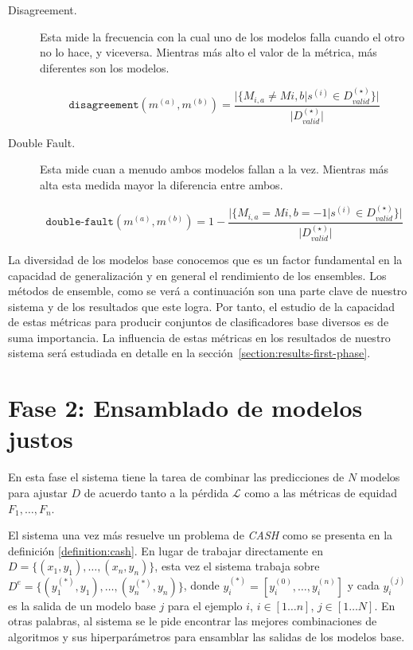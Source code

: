 \begin{description}

    \item[Disagreement.]
    Esta mide la frecuencia con la cual uno de los modelos falla cuando el otro no lo hace, y viceversa.
    Mientras más alto el valor de la métrica, más diferentes son los modelos.

    \begin{equation}
        \texttt{disagreement}(m^{(a)}, m^{(b)}) = \frac{\vert\{M_{i,a} \neq M{i,b} \vert s^{(i)} \in D^{(\star)}_{valid}\}\vert}{\vert D^{(\star)}_{valid} \vert}
    \end{equation}

    \item[Double Fault.]
    Esta mide cuan a menudo ambos modelos fallan a la vez.
    Mientras más alta esta medida mayor la diferencia entre ambos.

    \begin{equation}
        \texttt{double-fault}(m^{(a)}, m^{(b)}) = 1 - \frac{\vert\{M_{i,a} = M{i,b} = -1 \vert s^{(i)} \in D^{(\star)}_{valid}\}\vert}{\vert D^{(\star)}_{valid} \vert}
    \end{equation}
    
\end{description}

La diversidad de los modelos base conocemos que es un factor fundamental en la capacidad de generalización y en general el rendimiento de los ensembles.
Los métodos de ensemble, como se verá a continuación son una parte clave de nuestro sistema y de los resultados que este logra.
Por tanto, el estudio de la capacidad de estas métricas para producir conjuntos de clasificadores base diversos es de suma importancia.
La influencia de estas métricas en los resultados de nuestro sistema será estudiada en detalle en la sección~\ref{section:results-first-phase}.

\section{Fase 2: Ensamblado de modelos justos}\label{section:second-phase}

En esta fase el sistema tiene la tarea de combinar las predicciones de $N$ modelos para ajustar $D$ de acuerdo tanto a la pérdida $\mathcal{L}$ como a las métricas de equidad $F_1, \dots, F_n$.

El sistema una vez más resuelve un problema de \emph{CASH} como se presenta en la definición \ref{definition:cash}.
En lugar de trabajar directamente en $D = \{(x_1,y_1),\dots, (x_n,y_n)\}$, esta vez el sistema trabaja sobre $D^e = \{(y_1^{(*)}, y_1),\dots,(y_n^{(*)}, y_n)\}$, donde $y_i^{(*)} = [y_i^{(0)},\dots,y_i^{(n)}]$ y cada $y_i^{(j)}$ es la salida de un modelo base $j$ para el ejemplo $i$, $i\in[1 \dots n]$, $j\in[1 \dots N]$.
En otras palabras, al sistema se le pide encontrar las mejores combinaciones de algoritmos y sus hiperparámetros para ensamblar las salidas de los modelos base.


